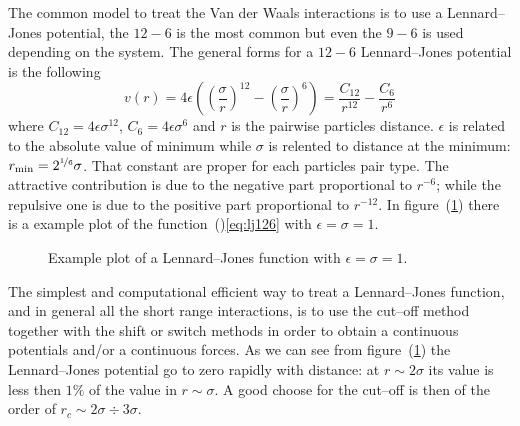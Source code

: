 The common model to treat the Van der Waals interactions is to use a Lennard--Jones potential, the $12-6$ is the most common but even the $9-6$ is used depending on the system. The general forms for a $12-6$ Lennard--Jones potential is the following
\begin{equation}
	v(r) = 4\epsilon\left ( \left ( \frac{\sigma}{r}\right )^{12}  - \left ( \frac{\sigma}{r} \right )^6 \right ) = \frac{C_{12}}{r^{12}} - \frac{C_{6}}{r^{6}}
	\label{eq:lj126}
\end{equation}
where $C_{12} = 4\epsilon\sigma^{12}$, $C_{6} = 4\epsilon\sigma^{6}$ and $r$ is the pairwise particles distance. $\epsilon$ is related to the absolute value of minimum while $\sigma$ is relented to distance at the minimum: $r_{\text{min}} = 2^{\nicefrac{1}{6}}\sigma$. That constant are proper for each particles pair type. The attractive contribution is due to the negative part proportional to $r^{-6}$; while the repulsive one is due to the positive part proportional to $r^{-12}$. In figure~(\ref{fig:LG12511}) there is a example plot of the function~()\eqref{eq:lj126} with $\epsilon = \sigma = 1$.
\begin{figure}[!ht]
\centering
	\caption{Example plot of a Lennard--Jones function with $\epsilon = \sigma = 1$.}
	\label{fig:LG12511}
\end{figure}

The simplest and computational efficient way to treat a Lennard--Jones function, and in general all the short range interactions, is to use the cut--off method together with the shift or switch methods in order to obtain a continuous potentials and/or a continuous forces. As we can see from figure~(\ref{fig:LG12511}) the Lennard--Jones potential go to zero rapidly with distance: at $r \sim 2\sigma$ its value is less then $1\%$ of the value in $r \sim \sigma$. A good choose for the cut--off is then of the order of $r_c \sim 2\sigma \div 3\sigma$.

